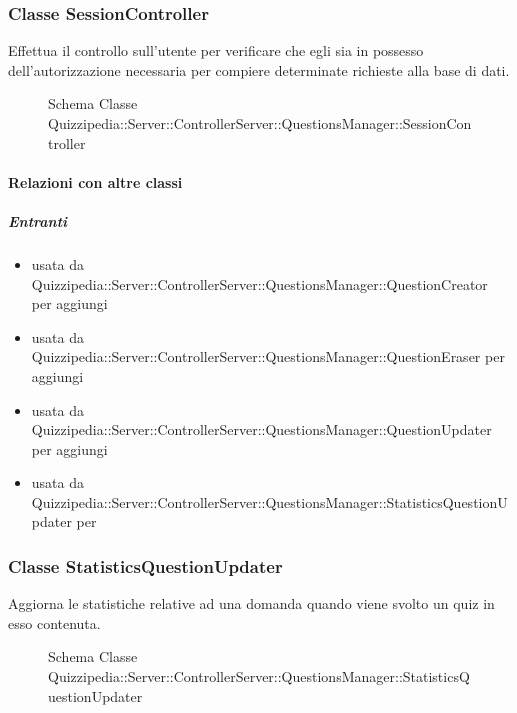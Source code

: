 \subsubsection{Classe SessionController}
Effettua il controllo sull'utente per verificare che egli sia in possesso dell'autorizzazione necessaria per compiere determinate richieste alla base di dati.
\begin{figure}[H]
\centering
\noindent{}
\caption[Schema Classe SessionController]{Schema Classe Quizzipedia::Server::ControllerServer::QuestionsManager::SessionController}
\end{figure}
\paragraph{Relazioni con altre classi}
\subparagraph{Entranti}
\begin{itemize}
\item usata da Quizzipedia::Server::ControllerServer::QuestionsManager::QuestionCreator per aggiungi
\item usata da Quizzipedia::Server::ControllerServer::QuestionsManager::QuestionEraser per aggiungi
\item usata da Quizzipedia::Server::ControllerServer::QuestionsManager::QuestionUpdater per aggiungi
\item usata da Quizzipedia::Server::ControllerServer::QuestionsManager::StatisticsQuestionUpdater per 
\end{itemize}
\subsubsection{Classe StatisticsQuestionUpdater}
Aggiorna le statistiche relative ad una domanda quando viene svolto un quiz in esso contenuta.
\begin{figure}[H]
\centering
\noindent{}
\caption[Schema Classe StatisticsQuestionUpdater]{Schema Classe Quizzipedia::Server::ControllerServer::QuestionsManager::StatisticsQuestionUpdater}
\end{figure}
